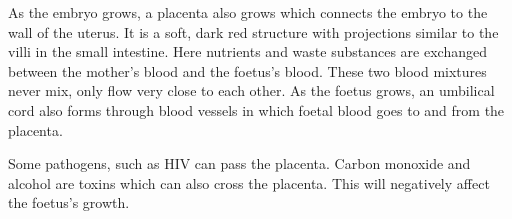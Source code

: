 As the embryo grows, a placenta also grows which connects the embryo to the wall of the uterus.
It is a soft, dark red structure with projections similar to the villi in the small intestine. 
Here nutrients and waste substances are exchanged between the mother's blood and the foetus's blood.
These two blood mixtures never mix, only flow very close to each other. As the foetus grows, an
umbilical cord also forms through blood vessels in which foetal blood goes to and from the placenta.

Some pathogens, such as HIV can pass the placenta. Carbon monoxide and alcohol are toxins which can
also cross the placenta. This will negatively affect the foetus's growth.

